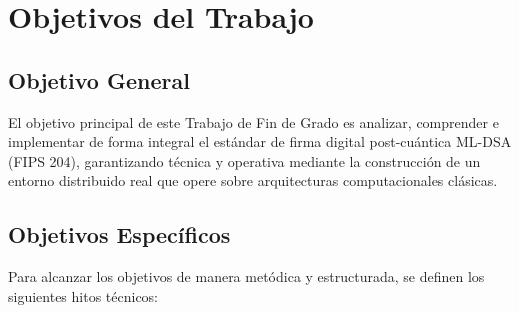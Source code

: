 \documentclass[11pt, a4paper]{report}
\theoremstyle{definition}
\begin{document}
\section{Objetivos del Trabajo}

\subsection{Objetivo General}

El objetivo principal de este Trabajo de Fin de Grado es analizar, comprender e implementar de forma integral el estándar de firma digital post-cuántica ML-DSA (FIPS 204), garantizando técnica y operativa mediante la construcción de un entorno distribuido real que opere sobre arquitecturas computacionales clásicas.

\subsection{Objetivos Específicos}

Para alcanzar los objetivos de manera metódica y estructurada, se definen los siguientes hitos técnicos:
\end{document}
